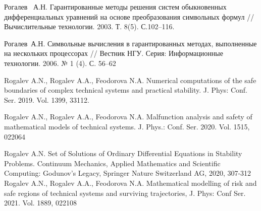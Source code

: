 \begin{thebibliography}{9}
 Рогалев~ А.Н. Гарантированные методы решения систем обыкновенных дифференциальных уравнений на основе преобразования символьных формул // Вычислительные технологии. 2003. Т. 8(5). С.102--116.

 Рогалев~А.Н. Символьные вычисления в гарантированных методах, выполненные на нескольких процессорах // Вестник НГУ. Серия: Информационные технологии.  2006.  № 1 (4).  С. 56--62

 Rogalev  A.N., Rogalev A.A., Feodorova N.A.  Numerical computations of the safe boundaries of complex technical systems and practical stability. J. Phys: Conf.  Ser. 2019.  Vol. 1399,  33112.

 Rogalev A.N., Rogalev A.A., Feodorova N.A.  Malfunction analysis and safety of mathematical models of technical systems. J. Phys.: Conf. Ser.  2020.  Vol. 1515,  022064

Rogalev A.N.   Set of Solutions of Ordinary Differential Equations in Stability Problems. Continuum Mechanics, Applied Mathematics and Scientific Computing: Godunov's Legacy, Springer Nature Switzerland AG, 2020,
 307-312
Rogalev A.N., Rogalev A.A., Feodorova N.A.
Mathematical modelling of risk and safe regions of technical systems and surviving trajectories,  J. Phys: Conf Ser.  2021. Vol. 1889, 022108

\end{thebibliography}





%

